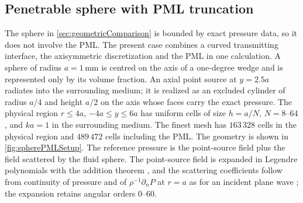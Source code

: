 \documentclass[final,12pt,nopreprintline,longtitle]{elsarticle}
\begin{document}
\FloatBarrier
\subsection{Penetrable sphere with PML truncation}
\label{sec:spherePML}

The sphere in \cref{sec:geometricComparison} is bounded by exact pressure
data, so it does not involve the PML.  The present case combines a curved
transmitting interface, the axisymmetric discretization and the PML in one
calculation.  A sphere of radius $a=1\,\mathrm{mm}$ is centred on the axis of
a one-degree wedge and is represented only by its volume fraction.  An axial
point source at $y=2.5a$ radiates into the surrounding medium; it is realized
as an excluded cylinder of radius $a/4$ and height $a/2$ on the axis whose
faces carry the exact pressure.  The physical region $r\leq4a$,
$-4a\leq y\leq6a$ has uniform cells of size $h=a/N$, $N=8$--$64$, and $ka=1$
in the surrounding medium.  The finest mesh has $163\,328$ cells in the
physical region and $489\,472$ cells including the PML.  The geometry is
shown in \cref{fig:spherePMLSetup}.  The reference pressure is the point-source field plus the field
scattered by the fluid sphere.  The point-source field is expanded in Legendre
polynomials with the addition theorem \cite[(10.60.1), (10.60.2)]{NIST:DLMF},
and the scattering coefficients follow from continuity of pressure and of
$\rho^{-1}\partial_nP$ at $r=a$ as for an incident plane wave
\cite{anderson1950sound}; the expansion retains angular orders $0$--$60$.
\end{document}
